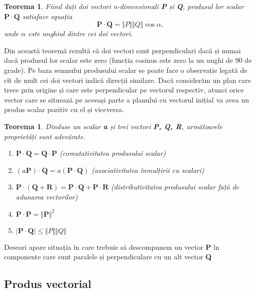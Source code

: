 \newtheorem{dotproduct_cosine}[vector_arith]{Teorema}
\begin{dotproduct_cosine}
Fiind dați doi vectori \textit{n}-dimensionali \textbf{P} și \textbf{Q},
produsul lor scalar $\mathbf{P \cdot Q}$ satisface equația
\begin{equation}
\label{eq:vec:11}
\mathbf{P \cdot Q} = \Vert P \Vert \Vert Q \Vert \cos \alpha,
\end{equation}
unde $\alpha$ este unghiul dintre cei doi vectori.
\end{dotproduct_cosine}
Din această teoremă rezultă că doi vectori sunt perpendiculari dacă și numai
dacă produsul lor scalar este zero (funcția cosinus este zero la un unghi de 90
de grade). Pe baza semnului produsului scalar se poate face o observație legată
de cît de mult cei doi vectori indică direcții similare. Dacă considerăm un plan
care trece prin origine și care este perpendicular pe vectorul respectiv, atunci
orice vector care se situează pe aceeași parte a planului cu vectorul inițial va
avea un produs scalar pozitiv cu el și viceversa.

\newtheorem{dotproduct_properties}[vector_arith]{Teorema}
\begin{dotproduct_properties}
Dînduse un scalar \textbf{a} și trei vectori \textbf{P, Q, R}, următoarele
proprietăți sunt adevărate.
\begin{enumerate}
  \item $\mathbf{P \cdot Q} = \mathbf{Q \cdot P}$ (comutativitatea produsului
  scalar)
  \item $(\mathit{a}\mathbf{P}) \cdot \mathbf{Q} = \mathit{a}(\mathbf{P \cdot
  Q})$ (asociativitatea înmulțirii cu scalari)
  \item $\mathbf{P} \cdot (\mathbf{Q + R}) = \mathbf{P \cdot Q + P \cdot R} $
  (distributivitatea produsului scalar față de adunarea vectorilor)
  \item $\mathbf{P \cdot P} = \Vert \mathbf{P} \Vert ^ 2$
  \item $\mathbf{\vert P \cdot Q \vert} \leq \Vert P \Vert \Vert Q \Vert$
\end{enumerate}
\end{dotproduct_properties}

Deseori apare situația în care trebuie să descompunem un vector \textbf{P} în
componente care sunt paralele și perpendiculare cu un alt vector \textbf{Q}

\subsection{Produs vectorial}
\label{ch1:sec_vectors:cross_product}
\indent

